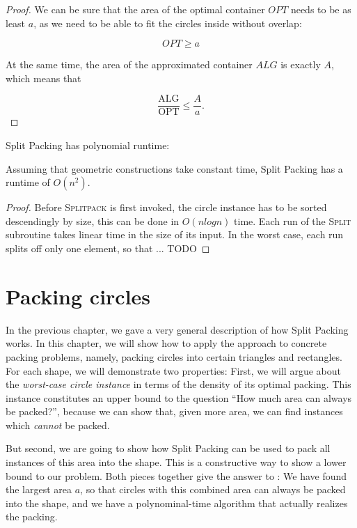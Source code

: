 \documentclass[a4paper,style=print,bibliography=totoc,nexus,lnum,extramargin]{tubsbook}
\begin{document}
\begin{proof}
    We can be sure that the area of the optimal container $OPT$ needs to be as least $a$, as we need to be able to fit the circles inside without overlap:

    $$OPT \ge a$$

    At the same time, the area of the approximated container $ALG$ is exactly $A$, which means that

    $$\frac{\text{ALG}}{\text{OPT}} \le \frac{A}{a}.$$
\end{proof}

Split Packing has polynomial runtime:

\begin{theorem}
    Assuming that geometric constructions take constant time, Split Packing has a runtime of $O(n^2)$.
\end{theorem}

\begin{proof}
    Before \textsc{Splitpack} is first invoked, the circle instance has to be sorted descendingly by size, this can be done in $O(n log n)$ time. Each run of the \textsc{Split} subroutine takes linear time in the size of its input. In the worst case, each run splits off only one element, so that ... TODO
\end{proof}

\chapter{Packing circles}\label{ch:circles}

In the previous chapter, we gave a very general description of how Split Packing works. In this chapter, we will show how to apply the approach to concrete packing problems, namely, packing circles into certain triangles and rectangles. For each shape, we will demonstrate two properties: First, we will argue about the \emph{worst-case circle instance} in terms of the density of its optimal packing. This instance constitutes an upper bound to the question “How much area can always be packed?”, because we can show that, given more area, we can find instances which \emph{cannot} be packed.

But second, we are going to show how Split Packing can be used to pack all instances of this area into the shape. This is a constructive way to show a lower bound to our problem. Both pieces together give the answer to : We have found the largest area $a$, so that circles with this combined area can always be packed into the shape, and we have a polynominal-time algorithm that actually realizes the packing.
\end{document}
